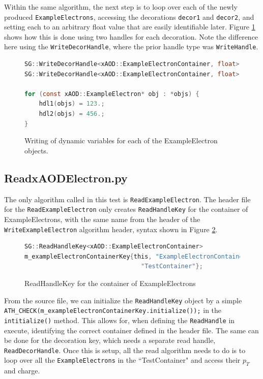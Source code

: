 Within the same algorithm, the next step is to loop over each of the newly produced \verb|ExampleElectrons|, accessing the decorations \verb|decor1| and \verb|decor2|, and setting each to an arbitrary float value that are easily identifiable later.
Figure \ref{fig:Mod_utests_WritexAODElectron2} shows how this is done using two handles for each decoration. 
Note the difference here using the \verb|WriteDecorHandle|, where the prior handle type was \verb|WriteHandle|.
\begin{figure}[h]
    \centering
\begin{lstlisting}[language=C]
SG::WriteDecorHandle<xAOD::ExampleElectronContainer, float> hdl1(m_decor1Key,ctx);
SG::WriteDecorHandle<xAOD::ExampleElectronContainer, float> hdl2(m_decor2Key,ctx);

for (const xAOD::ExampleElectron* obj : *objs) {
    hdl1(objs) = 123.;
    hdl2(objs) = 456.;
}
\end{lstlisting}
    \caption{Writing of dynamic variables for each of the ExampleElectron objects.}
    \label{fig:Mod_utests_WritexAODElectron2}
\end{figure}


\subsection{ReadxAODElectron.py}
The only algorithm called in this test is \verb|ReadExampleElectron|.
The header file for the \verb|ReadExampleElectron| only creates \verb|ReadHandleKey| for the container of ExampleElectrons, with the same name from the header of the \verb|WriteExampleElectron| algorithm header, syntax shown in Figure \ref{fig:Mod_utests_ReadxAODElectron1}.
\begin{figure}[h]
    \centering
\begin{lstlisting}[language=C]
SG::ReadHandleKey<xAOD::ExampleElectronContainer>
m_exampleElectronContainerKey{this, "ExampleElectronContainerName",
                                "TestContainer"};
\end{lstlisting}
    \caption{ReadHandleKey for the container of ExampleElectrons}
    \label{fig:Mod_utests_ReadxAODElectron1}
\end{figure}
From the source file, we can initialize the \verb|ReadHandleKey| object by a simple \verb|ATH_CHECK(m_exampleElectronContainerKey.initialize());| in the \verb|intitialize()| method.
This allows for, when defining the \verb|ReadHandle| in execute, identifying the correct container defined in the header file.
The same can be done for the decoration key, which needs a separate read handle, \verb|ReadDecorHandle|. 
Once this is setup, all the read algorithm needs to do is to loop over all the \verb|ExampleElectrons| in the ``TestContainer" and access their $p_T$ and charge.

